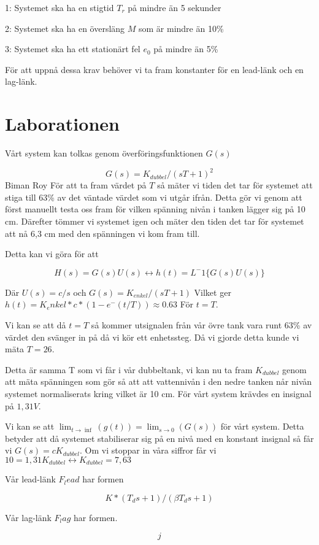 \documentclass{acm_proc_article-sp}
\begin{document}
1: Systemet ska ha en stigtid $T_r$ på mindre än 5 sekunder

2: Systemet ska ha en översläng $M$ som är mindre än 10\%

3: Systemet ska ha ett stationärt fel $e_0$ på mindre än 5\%

För att uppnå dessa krav behöver vi ta fram konstanter för en lead-länk och en lag-länk.

\section{Laborationen}

Vårt system kan tolkas genom överföringsfunktionen $G(s)$

\begin{equation}
G(s) = K_{dubbel}/(sT +1)^2
\end{equation}
Biman Roy
För att ta fram värdet på $T$ så mäter vi tiden det tar för systemet att stiga till 63\% av det väntade värdet som vi utgår ifrån. Detta gör vi genom att först manuellt testa oss fram för vilken spänning nivån i tanken lägger sig på 10 cm. Därefter tömmer vi systemet igen och mäter den tiden det tar för systemet att nå 6,3 cm med den spänningen vi kom fram till. 

Detta kan vi göra för att

\begin{equation}
H(s) = G(s)U(s) \leftrightarrow h(t) = L^-1\{G(s)U(s)\}
\end{equation}

Där $U(s) = c/s$ och $G(s) = K_{enkel}/(sT + 1)$ Vilket ger $h(t) = K_enkel * c * (1-e^-(t/T)) \approx 0.63$ För $t=T$.

Vi kan se att då $t = T$ så kommer utsignalen från vår övre tank vara runt 63\% av värdet den svänger in på då vi kör ett enhetssteg. Då vi gjorde detta kunde vi mäta $T = 26$.

Detta är samma T som vi får i vår dubbeltank, vi kan nu ta fram $K_{dubbel}$ genom att mäta spänningen som gör så att att vattennivån i den nedre tanken når nivån systemet normaliserats kring vilket är 10 cm. För vårt system krävdes en insignal på $1,31V$.

Vi kan se att $\lim_{t \rightarrow \inf}(g(t)) = \lim_{s \rightarrow 0}(G(s))$ för vårt system. Detta betyder att då systemet stabiliserar sig på en nivå med en konstant insignal så får vi $G(s) = c K_{dubbel}$. Om vi stoppar in våra siffror får vi $10 = 1,31 K_{dubbel} \leftrightarrow K_{dubbel} = 7,63$

Vår lead-länk $F_lead$ har formen

\begin{equation}
 K*(T_d s + 1)/(\beta T_d s +1)
\end{equation}

Vår lag-länk $F_lag$ har formen.

\begin{equation}
j
\end{equation}




\balancecolumns
\end{document}
